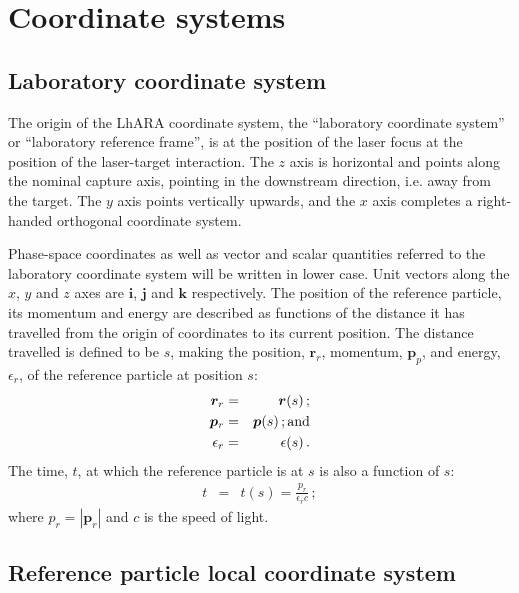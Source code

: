 \graphicspath{ {02-CoordinateSystems/Figures/} }

\section{Coordinate systems}

\subsection{Laboratory coordinate system}

The origin of the LhARA coordinate system, the ``laboratory coordinate
system'' or ``laboratory reference frame'', is at the position of the
laser focus at the position of the laser-target interaction.
The $z$ axis is horizontal and points along the nominal capture axis,
pointing in the downstream direction, i.e. away from the target.
The $y$ axis points vertically upwards, and the $x$ axis completes a
right-handed orthogonal coordinate system. 

Phase-space coordinates as well as vector and scalar quantities
referred to the laboratory coordinate system will be written in lower
case.
Unit vectors along the $x$, $y$ and $z$ axes are $\bm{i}$, $\bm{j}$
and $\bm{k}$ respectively.
The position of the reference particle, its momentum and energy are
described as functions of the distance it has travelled from the origin
of coordinates to its current position.
The distance travelled is defined to be $s$, making the position,
$\bm{r}_r$, momentum, $\bm{p}_p$, and energy, $\epsilon_r$, of the
reference particle at position $s$:
\begin{eqnarray}
  \bm{r}_r & = &   \bm{r}(s)\, ;           \nonumber \\
  \bm{p}_r & = &   \bm{p}(s)\, {\rm ; and} \nonumber \\
\epsilon_r & = & \epsilon(s)\, .           \nonumber
\end{eqnarray}
The time, $t$, at which the reference particle is at $s$ is also a
function of $s$:
\begin{eqnarray}
      t  & = & t(s) = \frac{p_r}{\epsilon_r c}\, ; \nonumber
\end{eqnarray}
where $p_r=\left|\bm{p}_r\right|$ and $c$ is the speed of light.

\subsection{Reference particle local coordinate system}

